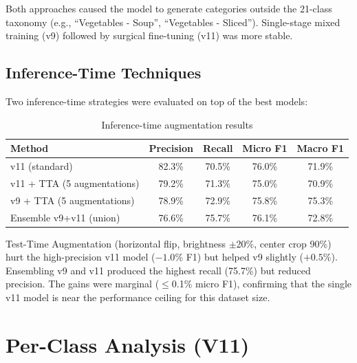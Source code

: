 \documentclass[11pt]{article}
\begin{document}
Both approaches caused the model to generate categories outside the 21-class taxonomy (e.g., ``Vegetables - Soup'', ``Vegetables - Sliced''). Single-stage mixed training (v9) followed by surgical fine-tuning (v11) was more stable.

\subsection{Inference-Time Techniques}

Two inference-time strategies were evaluated on top of the best models:

\begin{table}[h]
\centering
\caption{Inference-time augmentation results}
\begin{tabular}{lcccc}
\toprule
Method & Precision & Recall & Micro F1 & Macro F1 \\
\midrule
v11 (standard) & 82.3\% & 70.5\% & 76.0\% & 71.9\% \\
v11 + TTA (5 augmentations) & 79.2\% & 71.3\% & 75.0\% & 70.9\% \\
v9 + TTA (5 augmentations) & 78.9\% & 72.9\% & 75.8\% & 75.3\% \\
Ensemble v9+v11 (union) & 76.6\% & 75.7\% & 76.1\% & 72.8\% \\
\bottomrule
\end{tabular}
\end{table}

Test-Time Augmentation (horizontal flip, brightness $\pm$20\%, center crop 90\%) hurt the high-precision v11 model ($-1.0\%$ F1) but helped v9 slightly ($+0.5\%$). Ensembling v9 and v11 produced the highest recall (75.7\%) but reduced precision. The gains were marginal ($\leq$0.1\% micro F1), confirming that the single v11 model is near the performance ceiling for this dataset size.

\section{Per-Class Analysis (V11)}
\end{document}
